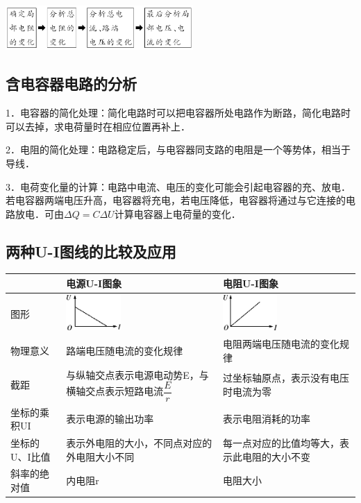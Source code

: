 \documentclass[cn,10.5pt,chinese,mac,chinesefont=founder]{elegantbook}
\begin{document}
\begin{center}\includegraphics[width=2.81111in,height=0.67014in]{media/image323.png}\end{center}

\newpage
\subsection{含电容器电路的分析}

1．电容器的简化处理：简化电路时可以把电容器所处电路作为断路，简化电路时可以去掉，求电荷量时在相应位置再补上．

2．电阻的简化处理：电路稳定后，与电容器同支路的电阻是一个等势体，相当于导线．

3．电荷变化量的计算：电路中电流、电压的变化可能会引起电容器的充、放电．若电容器两端电压升高，电容器将充电，若电压降低，电容器将通过与它连接的电路放电．可由$\Delta Q=C \Delta U$计算电容器上电荷量的变化．

\subsection{两种U-I图线的比较及应用}

\begin{longtable}[]{@{}m{2.5cm}m{5cm}m{5cm}@{}}
\toprule
& 电源U-I图象 & 电阻U-I图象\tabularnewline
\midrule
\endhead
图形 &
\includegraphics[width=0.82083in,height=0.5375in]{media/image325.png} &
\includegraphics[width=0.81111in,height=0.5375in]{media/image326.png}\tabularnewline
物理意义 & 路端电压随电流的变化规律 &
电阻两端电压随电流的变化规律\tabularnewline
截距 & 与纵轴交点表示电源电动势E，与横轴交点表示短路电流$\dfrac{E}{r}$ &
过坐标轴原点，表示没有电压时电流为零\tabularnewline
坐标的乘积UI & 表示电源的输出功率 & 表示电阻消耗的功率\tabularnewline
坐标的U、I比值 & 表示外电阻的大小，不同点对应的外电阻大小不同 &
每一点对应的比值均等大，表示此电阻的大小不变\tabularnewline
斜率的绝对值 & 内电阻r & 电阻大小\tabularnewline
\bottomrule
\end{longtable}
\end{document}
